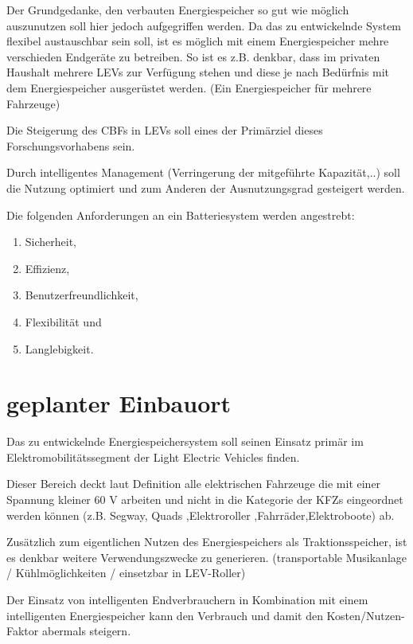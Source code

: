 Der Grundgedanke, den verbauten Energiespeicher so gut wie möglich auszunutzen soll hier jedoch aufgegriffen werden.
Da das zu entwickelnde System flexibel austauschbar sein soll, ist es möglich mit einem Energiespeicher mehre verschieden Endgeräte zu betreiben. So ist es z.B. denkbar, dass im privaten Haushalt mehrere  LEVs zur Verfügung stehen und diese je nach Bedürfnis mit dem Energiespeicher ausgerüstet werden. (Ein Energiespeicher für mehrere Fahrzeuge)

Die Steigerung des CBFs in LEVs soll eines der Primärziel dieses Forschungsvorhabens sein.

Durch intelligentes Management (Verringerung der mitgeführte Kapazität,..) soll die Nutzung optimiert und zum Anderen der Ausnutzungsgrad gesteigert werden.

Die folgenden Anforderungen an ein Batteriesystem werden angestrebt:
\begin{enumerate}
	\item Sicherheit, 
	\item Effizienz, 
	\item Benutzerfreundlichkeit, 
	\item Flexibilität und 
	\item Langlebigkeit.
\end{enumerate}

\section{geplanter Einbauort}
Das zu entwickelnde Energiespeichersystem soll seinen Einsatz primär im Elektromobilitätssegment der Light Electric Vehicles finden.

Dieser Bereich  deckt laut Definition alle elektrischen Fahrzeuge die mit einer Spannung kleiner 60 V arbeiten und nicht in die Kategorie der KFZs eingeordnet werden können (z.B. Segway, Quads ,Elektroroller ,Fahrräder,Elektroboote) ab. 

Zusätzlich zum eigentlichen Nutzen des Energiespeichers als Traktionsspeicher, ist es denkbar weitere Verwendungszwecke zu generieren. (transportable Musikanlage / Kühlmöglichkeiten / einsetzbar in LEV-Roller)


Der Einsatz von intelligenten Endverbrauchern in Kombination mit einem intelligenten Energiespeicher kann den Verbrauch und damit den Kosten/Nutzen-Faktor abermals steigern.


